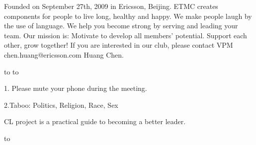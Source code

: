\subtitle[skyblue]{About Ericsson Toastmasters Club}

Founded on September 27th, 2009 in Ericsson, Beijing. 
ETMC creates components for people to live long, healthy 
and happy. We make people laugh by the use of language. 
We help you become strong by serving and leading your team. 
Our mission is: Motivate to develop all members' potential. 
Support each other, grow together! If you are interested in 
our club, please contact VPM chen.huang@ericsson.com Huang Chen.

{\offinterlineskip
\medskip

\moveleft\boxmargin\vbox{\hbox to }
\kern 2pt
\moveleft\boxmargin\vbox{\hbox to }
}

\theme{\themeinfo}
\ttime{\dateinfo}{\timeinfo}
\venue{\venueinfo}

\subtitle[orange]{Important Notice}

\item {1.} Please mute your phone during the meeting.
\item {2.}Taboo: Politics, Religion, Race, Sex

\subtitle[orange]{Competence Leadership Planning}

\noindent CL project is a practical guide to becoming a better leader.
\medskip

\hbox to 
\break


